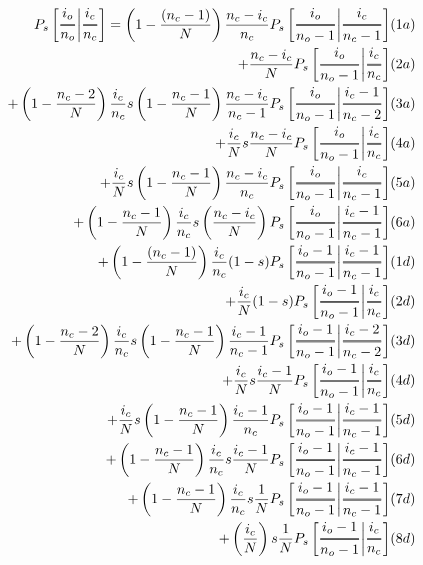 \documentclass[preview]{standalone}
\newcommand{\Dfrac}[2]{%
  \ooalign{%
    $\genfrac{}{}{1.2pt}0{#1}{#2}$\cr%
    $\color{white}\genfrac{}{}{.4pt}0{\phantom{#1}}{\phantom{#2}}$}%
}
\newcommand{\cond}{\middle\vert}
\begin{document}
\begin{equation*}
  \begin{aligned}
    P_s\left[ \Dfrac{i_o}{n_o} \cond \Dfrac{i_c}{n_c} \right]
    = \left(1-\frac{(n_c-1)}{N}\right)\frac{n_c-i_c}{n_c} P_s\left[ \Dfrac{i_o}{n_o-1} \cond
      \Dfrac{i_c}{n_c-1} \right]& (1a)\\ %
      + \frac{n_c-i_c}{N} P_s\left[ \Dfrac{i_o}{n_o-1} \cond \Dfrac{i_c}{n_c} \right]& (2a)\\ %
    + \left(1-\frac{n_c-2}{N}\right) \frac{i_c}{n_c} s  \left(1-\frac{n_c-1}{N}\right)
      \frac{n_c-i_c}{n_c-1} P_s\left[ \Dfrac{i_o}{n_o-1} \cond \Dfrac{i_c-1}{n_c-2} \right]& (3a) \\ %
    + \frac{i_c}{N} s  \frac{n_c-i_c}{N}  P_s\left[ \Dfrac{i_o}{n_o-1} \cond \Dfrac{i_c}{n_c}
      \right]  &  (4a) \\ %
    + \frac{i_c}{N} s  \left(1-\frac{n_c-1}{N}\right) \frac{n_c-i_c}{n_c}  P_s\left[
        \Dfrac{i_o}{n_o-1} \cond \Dfrac{i_c}{n_c-1} \right]& (5a) \\ %
    + \left(1-\frac{n_c-1}{N}\right) \frac{i_c}{n_c} s  \left(\frac{ n_c-i_c }{N}\right) P_s\left[
        \Dfrac{i_o}{n_o-1} \cond \Dfrac{i_c-1}{n_c-1} \right]& (6a) \\ %
    + \left(1-\frac{(n_c-1)}{N}\right)\frac{i_c}{n_c} (1-s) P_s\left[ \Dfrac{i_o-1}{n_o-1} \cond
      \Dfrac{i_c-1}{n_c-1} \right]& (1d) \\ %
      + \frac{i_c}{N} (1-s) P_s\left[ \Dfrac{i_o-1}{n_o-1} \cond \Dfrac{i_c}{n_c} \right]& (2d) \\ %
    + \left(1-\frac{n_c-2}{N}\right) \frac{i_c}{n_c} s  \left(1-\frac{n_c-1}{N}\right)
      \frac{i_c-1}{n_c-1} P_s\left[ \Dfrac{i_o-1}{n_o-1} \cond \Dfrac{i_c-2}{n_c-2} \right]& (3d) \\ %
    + \frac{i_c}{N} s  \frac{i_c-1}{N}   P_s\left[ \Dfrac{i_o-1}{n_o-1} \cond \Dfrac{i_c}{n_c}
      \right]& (4d) \\ %
    + \frac{i_c}{N} s  \left(1-\frac{n_c-1}{N}\right) \frac{i_c-1}{n_c}   P_s\left[
        \Dfrac{i_o-1}{n_o-1} \cond \Dfrac{i_c-1}{n_c-1} \right]& (5d) \\ %
    + \left(1-\frac{n_c-1}{N}\right) \frac{i_c}{n_c} s \frac{i_c-1}{N} P_s\left[
        \Dfrac{i_o-1}{n_o-1} \cond \Dfrac{i_c-1}{n_c-1} \right]& (6d) \\ %
    + \left(1-\frac{n_c-1}{N}\right) \frac{i_c}{n_c} s \frac{1}{N} P_s\left[
        \Dfrac{i_o-1}{n_o-1} \cond \Dfrac{i_c-1}{n_c-1} \right]& (7d) \\ %
    + \left(\frac{i_c}{N}\right) s \frac{1}{N} P_s\left[
        \Dfrac{i_o-1}{n_o-1} \cond \Dfrac{i_c}{n_c} \right]& (8d) \\ %
  \end{aligned}
\end{equation*}
\end{document}
